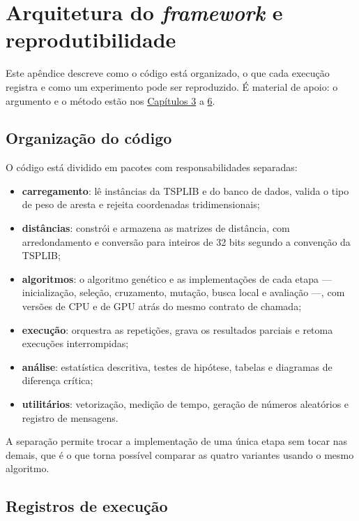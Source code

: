 \chapter{Arquitetura do \emph{framework} e reprodutibilidade}\label{apendice-framework}

Este apêndice descreve como o código está organizado, o que cada execução registra e como um experimento pode ser reproduzido.
É material de apoio: o argumento e o método estão nos \hyperref[cap3-materiais-metodos]{Capítulos 3} a \hyperref[cap6-conclusoes]{6}.

\section{Organização do código}\label{apendice-organizacao}

O código está dividido em pacotes com responsabilidades separadas:

\begin{itemize}
  \tightlist
  \item
        \textbf{carregamento}: lê instâncias da TSPLIB e do banco de dados, valida o tipo de peso de aresta e rejeita coordenadas tridimensionais;
  \item
        \textbf{distâncias}: constrói e armazena as matrizes de distância, com arredondamento e conversão para inteiros de 32 bits segundo a convenção da TSPLIB;
  \item
        \textbf{algoritmos}: o algoritmo genético e as implementações de cada etapa --- inicialização, seleção, cruzamento, mutação, busca local e avaliação ---, com versões de CPU e de GPU atrás do mesmo contrato de chamada;
  \item
        \textbf{execução}: orquestra as repetições, grava os resultados parciais e retoma execuções interrompidas;
  \item
        \textbf{análise}: estatística descritiva, testes de hipótese, tabelas e diagramas de diferença crítica;
  \item
        \textbf{utilitários}: vetorização, medição de tempo, geração de números aleatórios e registro de mensagens.
\end{itemize}

A separação permite trocar a implementação de uma única etapa sem tocar nas demais, que é o que torna possível comparar as quatro variantes usando o mesmo algoritmo.

\section{Registros de execução}\label{apendice-registros}

